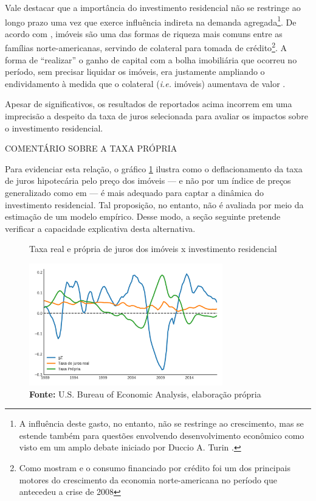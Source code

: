 Vale destacar que a importância do investimento residencial não se restringe ao longo prazo uma vez que exerce influência indireta na demanda agregada\footnote{
	A influência deste gasto, no entanto, não se restringe ao crescimento, mas se estende também para questões envolvendo desenvolvimento econômico como visto em um amplo debate iniciado por Duccio A. Turin \cite{pheng_revisit_1992}.}. 
De acordo com \textcite{teixeira_uma_2011}, imóveis são uma das formas de riqueza mais comuns entre as famílias norte-americanas, servindo de colateral para tomada de crédito\footnote{Como mostram \textcite{zezza_u.s._2008} e \textcite{barba_rising_2009} o consumo financiado por crédito foi um dos principais motores do crescimento da economia norte-americana no período que antecedeu a crise de 2008}. A forma de ``realizar'' o ganho de capital com a bolha imobiliária que ocorreu no período, sem precisar liquidar os imóveis, era justamente ampliando o endividamento à medida que o colateral (\textit{i.e.} imóveis) aumentava de valor \cite{teixeira_crescimento_2015}. 

Apesar de significativos, os resultados  de \textcite{huang_is_2018} reportados acima incorrem em uma imprecisão a despeito da taxa de juros selecionada para avaliar os impactos sobre o investimento residencial. 

COMENTÁRIO SOBRE A TAXA PRÓPRIA

Para evidenciar esta relação, o gráfico \ref{gZ_Propria} ilustra como  o deflacionamento da taxa de juros hipotecária pelo preço dos imóveis --- e não por um índice de preços generalizado como em \textcite[p.~143--146]{fair_macroeconometric_2013} --- é mais adequado para captar a dinâmica do investimento residencial. Tal proposição, no entanto, não é avaliada por meio da estimação de um modelo empírico. Desse modo, a seção seguinte pretende verificar a capacidade explicativa desta alternativa.


 
\begin{figure}[H]
	\centering
	\caption{Taxa real e própria de juros dos imóveis x investimento residencial}
	\label{gZ_Propria}
	\includegraphics[width=0.75\textwidth]{Fatos_Estilizados/Figs/TxPropria_Investo.png}
	\caption*{\textbf{Fonte:} U.S. Bureau of Economic Analysis, elaboração própria}
\end{figure}
